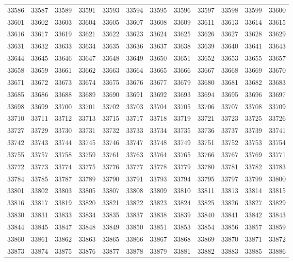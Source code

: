 \begin{center}
\begin{longtable}{llllllllllll}
33586 &33587 &33589 &33591 &33593 &33594 &33595 &33596 &33597 &33598 &33599 &33600 \\
33601 &33602 &33603 &33604 &33605 &33607 &33608 &33609 &33611 &33613 &33614 &33615 \\
33616 &33617 &33619 &33621 &33622 &33623 &33624 &33625 &33626 &33627 &33628 &33629 \\
33631 &33632 &33633 &33634 &33635 &33636 &33637 &33638 &33639 &33640 &33641 &33643 \\
33644 &33645 &33646 &33647 &33648 &33649 &33650 &33651 &33652 &33653 &33655 &33657 \\
33658 &33659 &33661 &33662 &33663 &33664 &33665 &33666 &33667 &33668 &33669 &33670 \\
33671 &33672 &33673 &33674 &33675 &33676 &33677 &33679 &33680 &33681 &33682 &33683 \\
33685 &33686 &33688 &33689 &33690 &33691 &33692 &33693 &33694 &33695 &33696 &33697 \\
33698 &33699 &33700 &33701 &33702 &33703 &33704 &33705 &33706 &33707 &33708 &33709 \\
33710 &33711 &33712 &33713 &33715 &33717 &33718 &33719 &33721 &33723 &33725 &33726 \\
33727 &33729 &33730 &33731 &33732 &33733 &33734 &33735 &33736 &33737 &33739 &33741 \\
33742 &33743 &33744 &33745 &33746 &33747 &33748 &33749 &33751 &33752 &33753 &33754 \\
33755 &33757 &33758 &33759 &33761 &33763 &33764 &33765 &33766 &33767 &33769 &33771 \\
33772 &33773 &33774 &33775 &33776 &33777 &33778 &33779 &33780 &33781 &33782 &33783 \\
33784 &33785 &33787 &33789 &33790 &33791 &33793 &33794 &33795 &33797 &33799 &33800 \\
33801 &33802 &33803 &33805 &33807 &33808 &33809 &33810 &33811 &33813 &33814 &33815 \\
33816 &33817 &33819 &33820 &33821 &33822 &33823 &33824 &33825 &33826 &33827 &33829 \\
33830 &33831 &33833 &33834 &33835 &33837 &33838 &33839 &33840 &33841 &33842 &33843 \\
33844 &33845 &33847 &33848 &33849 &33850 &33851 &33853 &33854 &33856 &33857 &33859 \\
33860 &33861 &33862 &33863 &33865 &33866 &33867 &33868 &33869 &33870 &33871 &33872 \\
33873 &33874 &33875 &33876 &33877 &33878 &33879 &33881 &33882 &33883 &33885 &33886 \\

\end{longtable}
\end{center}
